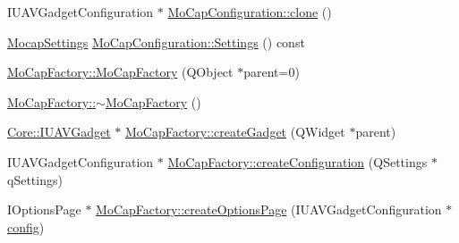 \begin{DoxyCompactItemize}
\item 
I\-U\-A\-V\-Gadget\-Configuration $\ast$ \hyperlink{group___h_i_t_l_plugin_gadc51635684ea1cfd6355b0ad8e0b40a6}{Mo\-Cap\-Configuration\-::clone} ()
\item 
\hyperlink{group___mo_cap_plugin_ga6083347a5b3eb70e360f599354dc0f0b}{Mocap\-Settings} \hyperlink{group___h_i_t_l_plugin_ga27cf83efd45539e4f87288010c5f285a}{Mo\-Cap\-Configuration\-::\-Settings} () const 
\item 
\hyperlink{group___h_i_t_l_plugin_ga4c5fc1e339794bad8a5ad59687380db0}{Mo\-Cap\-Factory\-::\-Mo\-Cap\-Factory} (Q\-Object $\ast$parent=0)
\item 
\hyperlink{group___h_i_t_l_plugin_gae7570bd6937d0e589152551bd0ff5cf1}{Mo\-Cap\-Factory\-::$\sim$\-Mo\-Cap\-Factory} ()
\item 
\hyperlink{class_core_1_1_i_u_a_v_gadget}{Core\-::\-I\-U\-A\-V\-Gadget} $\ast$ \hyperlink{group___h_i_t_l_plugin_ga4a3cc25be4de282c2017c0e9db77e31d}{Mo\-Cap\-Factory\-::create\-Gadget} (Q\-Widget $\ast$parent)
\item 
I\-U\-A\-V\-Gadget\-Configuration $\ast$ \hyperlink{group___h_i_t_l_plugin_gacb27abd92b935f31e14c22c97795e4e6}{Mo\-Cap\-Factory\-::create\-Configuration} (Q\-Settings $\ast$q\-Settings)
\item 
I\-Options\-Page $\ast$ \hyperlink{group___h_i_t_l_plugin_gaea471065fa9f7d73e26e9b744f2bb117}{Mo\-Cap\-Factory\-::create\-Options\-Page} (I\-U\-A\-V\-Gadget\-Configuration $\ast$\hyperlink{deflate_8c_a4473b5227787415097004fd39f55185e}{config})
\end{DoxyCompactItemize}
